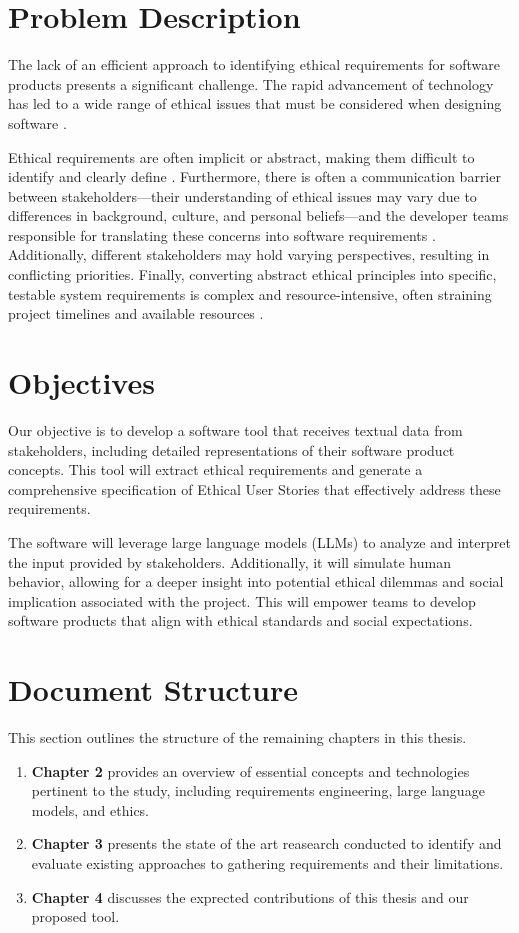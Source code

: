\section{Problem Description}
The lack of an efficient approach to identifying ethical requirements for software products presents a significant challenge. The rapid advancement of technology has led to a wide range of 
ethical issues that must be considered when designing software \cite{gogoll2021ethics}. 

Ethical requirements are often implicit or abstract, making them difficult to identify and clearly define \cite{biableethics2022}. Furthermore, there is often a communication barrier between 
stakeholders—their understanding of ethical issues may vary due to differences in background, culture, and personal beliefs—and the developer teams responsible for translating these concerns into 
software requirements \cite{biableethics2022}.
Additionally, different stakeholders may hold varying perspectives, resulting in conflicting priorities. Finally, converting abstract ethical principles into specific, testable 
system requirements is complex and resource-intensive, often straining project timelines and available resources \cite{gogoll2021ethics}.

\section{Objectives}
Our objective is to develop a software tool that receives textual data from stakeholders, including detailed representations of their software product concepts. This tool will extract ethical 
requirements and generate a comprehensive specification of Ethical User Stories that effectively address these requirements.

The software will leverage large language models (LLMs) to analyze and interpret the input provided by stakeholders. Additionally, it will simulate human behavior, allowing for a deeper insight
into potential ethical dilemmas and social implication associated with the project. This will empower teams to develop software products that align with ethical standards and social expectations.



\section{Document Structure}
This section outlines the structure of the remaining chapters in this thesis.

\begin{enumerate}
    \item \textbf{Chapter 2} provides an overview of essential concepts and technologies pertinent to the study, including requirements engineering, large language models, and ethics.
    \item \textbf{Chapter 3} presents the state of the art reasearch conducted to identify and evaluate existing approaches to gathering requirements and their limitations.
    \item \textbf{Chapter 4} discusses the exprected contributions of this thesis and our proposed tool.
\end{enumerate}


